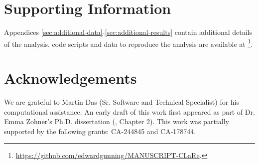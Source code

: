 \section*{Supporting Information}

Appendices \ref{sec:additional-data}-\ref{sec:additional-results} contain additional details of the analysis.
 code scripts and data to reproduce the analysis are available at \footnote{ \url{https://github.com/edwardgunning/MANUSCRIPT-CLaRe}.}.

\section*{Acknowledgements}
We are grateful to Martin Das (Sr. Software and Technical Specialist) for his computational assistance.
An early draft of this work first appeared as part of Dr. Emma Zohner's Ph.D. dissertation (\citeyear{zohner_feature_2021}, Chapter 2).
This work was partially supported by the following grants: CA-244845 and CA-178744.